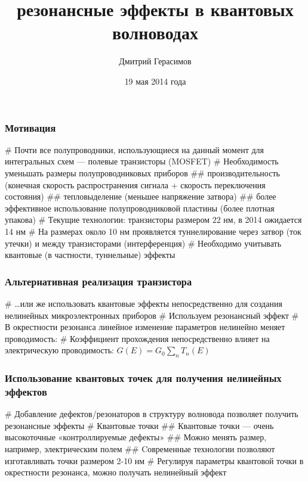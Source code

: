 \documentclass{beamer}
\title[]{\todo{Метод R-матриц и} резонансные эффекты в квантовых волноводах}
\author{Дмитрий Герасимов}
\institute[ИТМО]{Университет ИТМО}
\date{19 мая 2014 года}
\begin{document}
\maketitle

\begin{frame}[fragile]
\frametitle{Мотивация}
\begin{easylist}[itemize]
# Почти все полупроводники, использующиеся на данный момент для интегральных схем — полевые транзисторы (MOSFET)
# Необходимость уменьшать размеры полупроводниковых приборов
## производительность (конечная скорость распространения сигнала + скорость переключения состояния)
## тепловыделение (меньшее напряжение затвора)
## более эффективное использование полупроводниковой пластины (более плотная упакова)
# Текущие технологии: транзисторы размером 22 нм, в 2014 ожидается 14 нм
# На размерах около 10 нм проявляется туннелирование через затвор (ток утечки) и между транзисторами (интерференция)
# Необходимо учитывать квантовые (в частности, туннельные) эффекты
\end{easylist}
\end{frame}

\begin{frame}[fragile]
\frametitle{Альтернативная реализация транзистора}
\begin{easylist}[itemize]
# \dots или же использовать квантовые эффекты непосредственно для создания нелинейных микроэлектронных приборов
# Используем резонансный эффект 
# В окрестности резонанса линейное изменение параметров нелинейно меняет проводимость: 
# Коэффициент прохождения непосредственно влияет на электрическую проводимость: $G(E) = G_0 \sum\limits_n T_n(E)$ %
\end{easylist}
\end{frame}

\begin{frame}[fragile]
\frametitle{Использование квантовых точек для получения нелинейных эффектов}
\begin{easylist}[itemize]
# Добавление дефектов/резонаторов в структуру волновода позволяет получить резонансные эффекты
# Квантовые точки
## Квантовые точки — очень высокоточные «контроллируемые дефекты»
## Можно менять размер, например, электрическим полем 
## Cовременные технологии позволяют изготавливать точки размером 2-10 нм
# Регулируя параметры квантовой точки в окрестности резонанса, можно получать нелинейный эффект
\end{easylist}
\end{frame}
\end{document}
